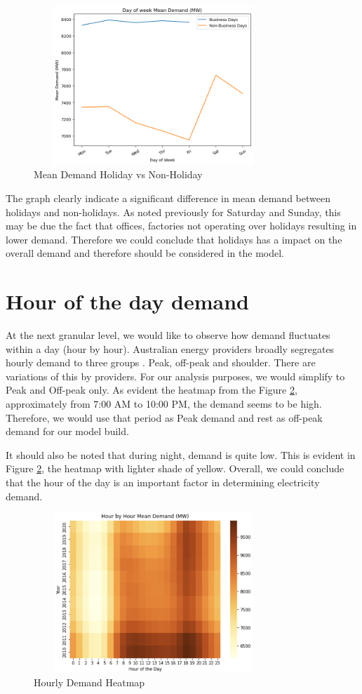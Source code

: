 \documentclass[mstat,12pt]{unswthesis}
\begin{document}
\begin{figure}[H]
\centering
\includegraphics[width=0.80\textwidth,height=6cm]{day_demand.png}
\caption{Mean Demand Holiday vs Non-Holiday}
\label{day_demand}
\end{figure}

The graph clearly indicate a significant difference in mean demand
between holidays and non-holidays. As noted previously for Saturday and
Sunday, this may be due the fact that offices, factories not operating
over holidays resulting in lower demand. Therefore we could conclude
that holidays has a impact on the overall demand and therefore should be
considered in the model.

\section{Hour of the day demand}\label{hour-of-the-day-demand}

At the next granular level, we would like to observe how demand
fluctuates within a day (hour by hour). Australian energy providers
broadly segregates hourly demand to three groups
\cite{wrigley_2019_peak}. Peak, off-peak and shoulder. There are
variations of this by providers. For our analysis purposes, we would
simplify to Peak and Off-peak only. As evident the heatmap from the
Figure \ref{hour_heat}, approximately from 7:00 AM to 10:00 PM, the
demand seems to be high. Therefore, we would use that period as Peak
demand and rest as off-peak demand for our model build.

It should also be noted that during night, demand is quite low. This is
evident in Figure \ref{hour_heat}, the heatmap with lighter shade of
yellow. Overall, we could conclude that the hour of the day is an
important factor in determining electricity demand.

\begin{figure}[H]
\centering
\includegraphics[width=0.80\textwidth,height=6cm]{hour_heat.png}
\caption{Hourly Demand Heatmap}
\label{hour_heat}
\end{figure}
\end{document}
